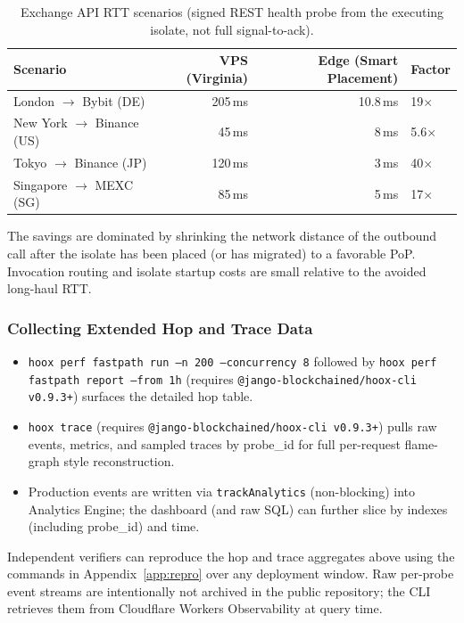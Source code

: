 \begin{table}[t]
  \centering
  \caption{Exchange API RTT scenarios (signed REST health probe from the executing isolate, not full signal-to-ack).}
  \label{tab:scenarios}
  \small
  \begin{tabular*}{\linewidth}{@{\extracolsep{\fill}}lrrl@{}}
    \toprule
    \textbf{Scenario} & \textbf{VPS (Virginia)} & \textbf{Edge (Smart Placement)} & \textbf{Factor} \\
    \midrule
    London $\to$ Bybit (DE) & 205\,ms & 10.8\,ms & 19$\times$ \\
    New York $\to$ Binance (US) & 45\,ms & 8\,ms & 5.6$\times$ \\
    Tokyo $\to$ Binance (JP) & 120\,ms & 3\,ms & 40$\times$ \\
    Singapore $\to$ MEXC (SG) & 85\,ms & 5\,ms & 17$\times$ \\
    \bottomrule
  \end{tabular*}
\end{table}

The savings are dominated by shrinking the network distance of the outbound call after the isolate has been placed (or has migrated) to a favorable PoP. Invocation routing and isolate startup costs are small relative to the avoided long-haul RTT.

\subsubsection{Collecting Extended Hop and Trace Data}

\begin{itemize}
  \item \texttt{hoox perf fastpath run --n 200 --concurrency 8} followed by \texttt{hoox perf fastpath report --from 1h} (requires \texttt{@jango-blockchained/hoox-cli v0.9.3+}) surfaces the detailed hop table.
  \item \texttt{hoox trace} (requires \texttt{@jango-blockchained/hoox-cli v0.9.3+}) pulls raw events, metrics, and sampled traces by probe\_id for full per-request flame-graph style reconstruction.
  \item Production events are written via \texttt{trackAnalytics} (non-blocking) into Analytics Engine; the dashboard (and raw SQL) can further slice by indexes (including probe\_id) and time.
\end{itemize}

Independent verifiers can reproduce the hop and trace aggregates above using the commands in Appendix~\ref{app:repro} over any deployment window. Raw per-probe event streams are intentionally not archived in the public repository; the CLI retrieves them from Cloudflare Workers Observability at query time.


